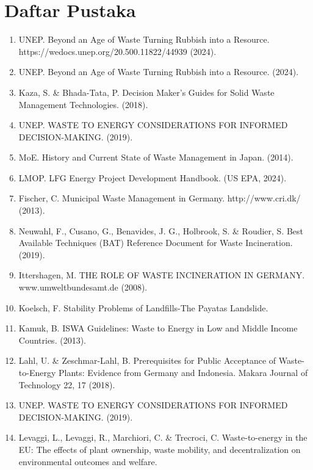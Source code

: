\documentclass[
  letterpaper,
  DIV=11,
  numbers=noendperiod]{scrreprt}
\providecommand{\tightlist}{%
  \setlength{\itemsep}{0pt}\setlength{\parskip}{0pt}}
\begin{document}

\chapter*{Daftar Pustaka}\label{daftar-pustaka}


\begin{enumerate}
\def\labelenumi{\arabic{enumi}.}
\tightlist
\item
  UNEP. Beyond an Age of Waste Turning Rubbish into a Resource.
  https://wedocs.unep.org/20.500.11822/44939 (2024).
\item
  UNEP. Beyond an Age of Waste Turning Rubbish into a Resource. (2024).
\item
  Kaza, S. \& Bhada-Tata, P. Decision Maker's Guides for Solid Waste
  Management Technologies. (2018).
\item
  UNEP. WASTE TO ENERGY CONSIDERATIONS FOR INFORMED DECISION-MAKING.
  (2019).
\item
  MoE. History and Current State of Waste Management in Japan. (2014).
\item
  LMOP. LFG Energy Project Development Handbook. (US EPA, 2024).
\item
  Fischer, C. Municipal Waste Management in Germany. http://www.cri.dk/
  (2013).
\item
  Neuwahl, F., Cusano, G., Benavides, J. G., Holbrook, S. \& Roudier, S.
  Best Available Techniques (BAT) Reference Document for Waste
  Incineration. (2019).
\item
  Ittershagen, M. THE ROLE OF WASTE INCINERATION IN GERMANY.
  www.umweltbundesamt.de (2008).
\item
  Koelsch, F. Stability Problems of Landfills-The Payatas Landslide.
\item
  Kamuk, B. ISWA Guidelines: Waste to Energy in Low and Middle Income
  Countries. (2013).
\item
  Lahl, U. \& Zeschmar-Lahl, B. Prerequisites for Public Acceptance of
  Waste-to-Energy Plants: Evidence from Germany and Indonesia. Makara
  Journal of Technology 22, 17 (2018).
\item
  UNEP. WASTE TO ENERGY CONSIDERATIONS FOR INFORMED DECISION-MAKING.
  (2019).
\item
  Levaggi, L., Levaggi, R., Marchiori, C. \& Trecroci, C.
  Waste-to-energy in the EU: The effects of plant ownership, waste
  mobility, and decentralization on environmental outcomes and welfare.

\end{enumerate}
\end{document}
